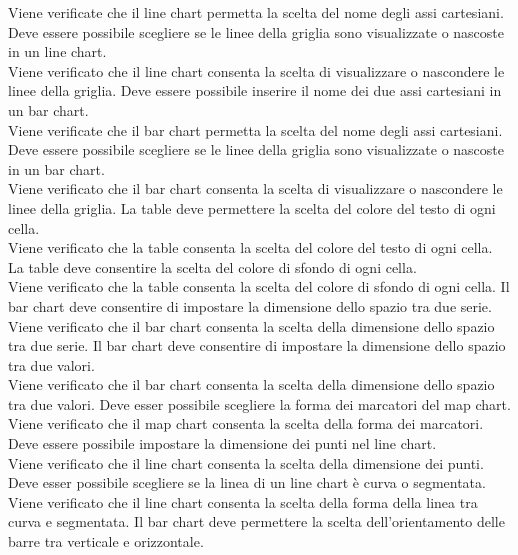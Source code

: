 Viene verificate che il line chart permetta la scelta del nome degli assi cartesiani.
 Deve essere possibile scegliere se le linee della griglia sono visualizzate o nascoste in un line chart.\\
Viene verificato che il line chart consenta la scelta di visualizzare o nascondere le linee della griglia.
 Deve essere possibile inserire il nome dei due assi cartesiani in un bar chart.\\
Viene verificate che il bar chart permetta la scelta del nome degli assi cartesiani.
	Deve essere possibile scegliere se le linee della griglia sono visualizzate o nascoste in un bar chart.\\
Viene verificato che il bar chart consenta la scelta di visualizzare o nascondere le linee della griglia.
 La table deve permettere la scelta del colore del testo di ogni cella.\\
Viene verificato che la table consenta la scelta del colore del testo di ogni cella.
 La table deve consentire la scelta del colore di sfondo di ogni cella.\\
Viene verificato che la table consenta la scelta del colore di sfondo di ogni cella.
 Il bar chart deve consentire di impostare la dimensione dello spazio tra due serie.\\
Viene verificato che il bar chart consenta la scelta della dimensione dello spazio tra due serie.
 Il bar chart deve consentire di impostare la dimensione dello spazio tra due valori.\\
Viene verificato che il bar chart consenta la scelta della dimensione dello spazio tra due valori.
 Deve esser possibile scegliere la forma dei marcatori del map chart.\\
Viene verificato che il map chart consenta la scelta della forma dei marcatori.
 Deve essere possibile impostare la dimensione dei punti nel line chart.\\
Viene verificato che il line chart consenta la scelta della dimensione dei punti.
	Deve esser possibile scegliere se la linea di un line chart è curva o segmentata.\\
Viene verificato che il line chart consenta la scelta della forma della linea tra curva e segmentata.
 Il bar chart deve permettere la scelta dell'orientamento delle barre tra verticale e orizzontale.\\
